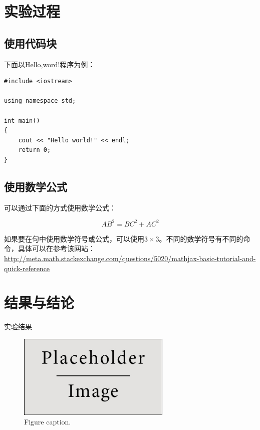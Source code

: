 \documentclass[hyperref,UTF8]{ctexart}
\begin{document}
\section{实验过程}

\subsection{使用代码块}

下面以Hello,word!程序为例：

\begin{lstlisting}
#include <iostream>

using namespace std;

int main()
{
    cout << "Hello world!" << endl;
    return 0;
}
\end{lstlisting}

\subsection{使用数学公式}

可以通过下面的方式使用数学公式：

\begin{equation}
AB^2 = BC^2 + AC^2
\end{equation}

如果要在句中使用数学符号或公式，可以使用$3 \times 3$。不同的数学符号有不同的命令，具体可以在参考该网站：\url{http://meta.math.stackexchange.com/questions/5020/mathjax-basic-tutorial-and-quick-reference}

\section{结果与结论}

实验结果
\begin{figure}[h]
\begin{center}
\includegraphics[width=0.65\textwidth]{placeholder} %
\caption{Figure caption.}
\end{center}
\end{figure}
\end{document}
